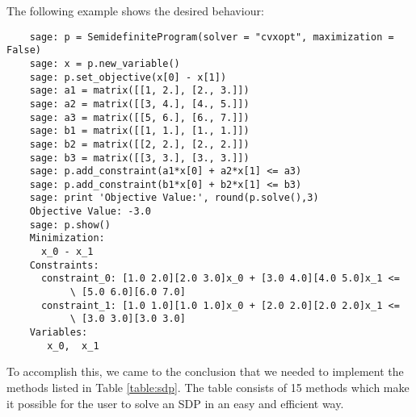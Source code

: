The following example shows the desired behaviour:
\begin{verbatim}
    sage: p = SemidefiniteProgram(solver = "cvxopt", maximization = False)
    sage: x = p.new_variable()
    sage: p.set_objective(x[0] - x[1])
    sage: a1 = matrix([[1, 2.], [2., 3.]])
    sage: a2 = matrix([[3, 4.], [4., 5.]])
    sage: a3 = matrix([[5, 6.], [6., 7.]])
    sage: b1 = matrix([[1, 1.], [1., 1.]])
    sage: b2 = matrix([[2, 2.], [2., 2.]])
    sage: b3 = matrix([[3, 3.], [3., 3.]])
    sage: p.add_constraint(a1*x[0] + a2*x[1] <= a3)
    sage: p.add_constraint(b1*x[0] + b2*x[1] <= b3)
    sage: print 'Objective Value:', round(p.solve(),3)
    Objective Value: -3.0
    sage: p.show()
    Minimization:
      x_0 - x_1
    Constraints:
      constraint_0: [1.0 2.0][2.0 3.0]x_0 + [3.0 4.0][4.0 5.0]x_1 <= 
           \ [5.0 6.0][6.0 7.0]
      constraint_1: [1.0 1.0][1.0 1.0]x_0 + [2.0 2.0][2.0 2.0]x_1 <=  
           \ [3.0 3.0][3.0 3.0]
    Variables:
       x_0,  x_1
\end{verbatim} 



To accomplish this, we came to the conclusion that we needed to implement the methods listed in Table \ref{table:sdp}.
The table consists of 15 methods which make it possible for the user to solve an SDP in an easy and efficient way. 

